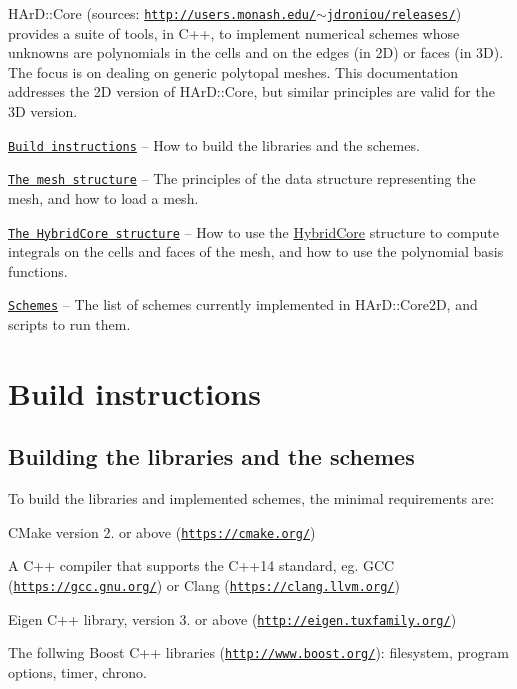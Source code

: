 H\+Ar\+D\+::\+Core (sources\+: \href{http://users.monash.edu/~jdroniou/releases/}{\tt http\+://users.\+monash.\+edu/$\sim$jdroniou/releases/}) provides a suite of tools, in C++, to implement numerical schemes whose unknowns are polynomials in the cells and on the edges (in 2D) or faces (in 3D). The focus is on dealing on generic polytopal meshes. This documentation addresses the 2D version of H\+Ar\+D\+::\+Core, but similar principles are valid for the 3D version.


\begin{DoxyItemize}
\item \href{#build}{\tt Build instructions} -- How to build the libraries and the schemes.
\item \href{#mesh}{\tt The mesh structure} -- The principles of the data structure representing the mesh, and how to load a mesh.
\item \href{#hybridcore}{\tt The Hybrid\+Core structure} -- How to use the \hyperlink{classHArDCore2D_1_1HybridCore}{Hybrid\+Core} structure to compute integrals on the cells and faces of the mesh, and how to use the polynomial basis functions.
\item \href{#schemes}{\tt Schemes} -- The list of schemes currently implemented in H\+Ar\+D\+::\+Core2D, and scripts to run them.
\end{DoxyItemize}

\label{_build}%
 \hypertarget{index_build}{}\section{Build instructions}\label{index_build}
\hypertarget{index_buildlib}{}\subsection{Building the libraries and the schemes}\label{index_buildlib}
To build the libraries and implemented schemes, the minimal requirements are\+:


\begin{DoxyItemize}
\item C\+Make version 2. or above (\href{https://cmake.org/}{\tt https\+://cmake.\+org/})
\item A C++ compiler that supports the C++14 standard, eg. G\+CC (\href{https://gcc.gnu.org/}{\tt https\+://gcc.\+gnu.\+org/}) or Clang (\href{https://clang.llvm.org/}{\tt https\+://clang.\+llvm.\+org/})
\item Eigen C++ library, version 3. or above (\href{http://eigen.tuxfamily.org/}{\tt http\+://eigen.\+tuxfamily.\+org/})
\item The follwing Boost C++ libraries (\href{http://www.boost.org/}{\tt http\+://www.\+boost.\+org/})\+: filesystem, program options, timer, chrono.
\end{DoxyItemize}

